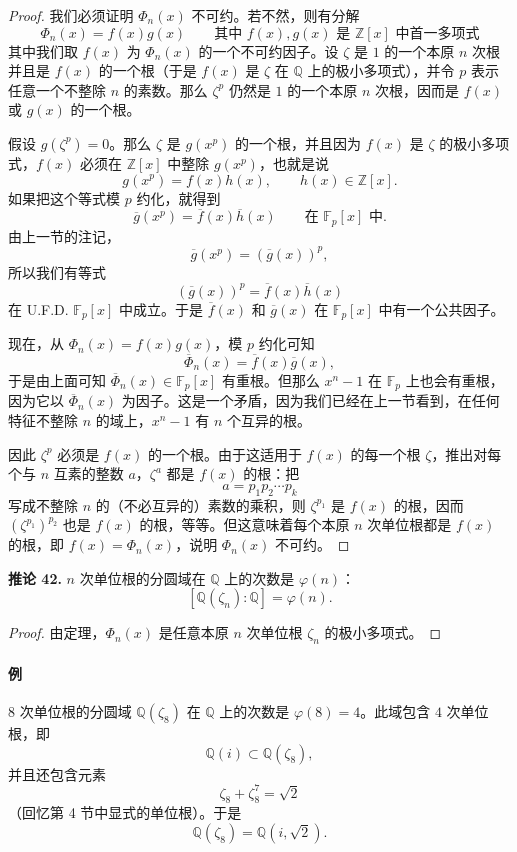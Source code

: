 \begin{proof}
	我们必须证明 $\Phi_n(x)$ 不可约。若不然，则有分解
	\[
	\Phi_n(x)=f(x)g(x)\qquad\text{其中 } f(x),g(x)\text{ 是 }\mathbb Z[x]\text{ 中首一多项式}
	\]
	其中我们取 $f(x)$ 为 $\Phi_n(x)$ 的一个不可约因子。设 $\zeta$ 是 $1$ 的一个本原 $n$ 次根并且是 $f(x)$ 的一个根（于是 $f(x)$ 是 $\zeta$ 在 $\mathbb Q$ 上的极小多项式），并令 $p$ 表示任意一个不整除 $n$ 的素数。那么 $\zeta^p$ 仍然是 $1$ 的一个本原 $n$ 次根，因而是 $f(x)$ 或 $g(x)$ 的一个根。
	
	假设 $g(\zeta^p)=0$。那么 $\zeta$ 是 $g(x^p)$ 的一个根，并且因为 $f(x)$ 是 $\zeta$ 的极小多项式，$f(x)$ 必须在 $\mathbb Z[x]$ 中整除 $g(x^p)$，也就是说
	\[
	g(x^p)=f(x)h(x),\qquad h(x)\in\mathbb Z[x].
	\]
	如果把这个等式模 $p$ 约化，就得到
	\[
	\overline{g}(x^p)=\overline{f}(x)\overline{h}(x) \qquad\text{在 }\mathbb F_p[x]\text{ 中}.
	\]
	由上一节的注记，
	\[
	\overline{g}(x^p)=(\overline{g}(x))^p,
	\]
	所以我们有等式
	\[
	(\overline{g}(x))^p=\overline{f}(x)\overline{h}(x)
	\]
	在 U.F.D. $\mathbb F_p[x]$ 中成立。于是 $\overline{f}(x)$ 和 $\overline{g}(x)$ 在 $\mathbb F_p[x]$ 中有一个公共因子。
	
	现在，从 $\Phi_n(x)=f(x)g(x)$，模 $p$ 约化可知
	\[
	\overline{\Phi}_n(x)=\overline{f}(x)\overline{g}(x),
	\]
	于是由上面可知 $\overline{\Phi}_n(x)\in\mathbb F_p[x]$ 有重根。但那么 $x^n-1$ 在 $\mathbb F_p$ 上也会有重根，因为它以 $\overline{\Phi}_n(x)$ 为因子。这是一个矛盾，因为我们已经在上一节看到，在任何特征不整除 $n$ 的域上，$x^n-1$ 有 $n$ 个互异的根。
	
	因此 $\zeta^p$ 必须是 $f(x)$ 的一个根。由于这适用于 $f(x)$ 的每一个根 $\zeta$，推出对每个与 $n$ 互素的整数 $a$，$\zeta^a$ 都是 $f(x)$ 的根：把
	\[
	a=p_1p_2\cdots p_k
	\]
	写成不整除 $n$ 的（不必互异的）素数的乘积，则 $\zeta^{p_1}$ 是 $f(x)$ 的根，因而 $(\zeta^{p_1})^{p_2}$ 也是 $f(x)$ 的根，等等。但这意味着每个本原 $n$ 次单位根都是 $f(x)$ 的根，即 $f(x)=\Phi_n(x)$，说明 $\Phi_n(x)$ 不可约。
\end{proof}

\noindent\textbf{推论 42.} $n$ 次单位根的分圆域在 $\mathbb Q$ 上的次数是 $\varphi(n)$：
\[
[\mathbb Q(\zeta_n):\mathbb Q]=\varphi(n).
\]

\begin{proof}
	由定理，$\Phi_n(x)$ 是任意本原 $n$ 次单位根 $\zeta_n$ 的极小多项式。
\end{proof}

\paragraph{例}
$8$ 次单位根的分圆域 $\mathbb Q(\zeta_8)$ 在 $\mathbb Q$ 上的次数是 $\varphi(8)=4$。此域包含 $4$ 次单位根，即
\[
\mathbb Q(i)\subset \mathbb Q(\zeta_8),
\]
并且还包含元素
\[
\zeta_8+\zeta_8^7=\sqrt2
\]
（回忆第 4 节中显式的单位根）。于是
\[
\mathbb Q(\zeta_8)=\mathbb Q(i,\sqrt2).
\]

